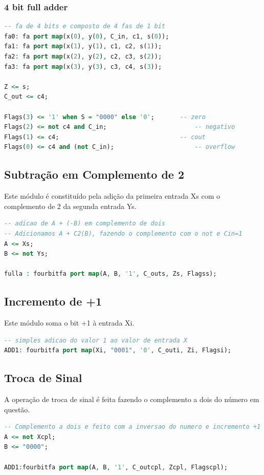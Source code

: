 \documentclass[a4paper, 12pt]{article}
\begin{document}
\subsubsection{4 bit full adder}


\begin{lstlisting}[language=VHDL]
-- fa de 4 bits e composto de 4 fas de 1 bit
fa0: fa port map(x(0), y(0), C_in, c1, s(0));
fa1: fa port map(x(1), y(1), c1, c2, s(1));
fa2: fa port map(x(2), y(2), c2, c3, s(2));
fa3: fa port map(x(3), y(3), c3, c4, s(3));

Z <= s;
C_out <= c4;

Flags(3) <= '1' when S = "0000" else '0';       -- zero
Flags(2) <= not c4 and C_in;				        -- negativo
Flags(1) <= c4;	                                -- cout
Flags(0) <= c4 and (not C_in); 					    -- overflow
\end{lstlisting}

\subsection{Subtração em Complemento de 2}
Este módulo é constituído pela adição da primeira entrada Xs com o complemento de 2 da segunda entrada Ys.

\begin{lstlisting}[language=VHDL]
-- adicao de A + (-B) em complemento de dois
-- Adicionamos A + C2(B), fazendo o complemento com o not e Cin=1
A <= Xs;
B <= not Ys;

fulla : fourbitfa port map(A, B, '1', C_outs, Zs, Flagss);
\end{lstlisting}


\subsection{Incremento de +1}
Este módulo soma o bit +1 à entrada Xi.

\begin{lstlisting}[language=VHDL]
-- simples adicao do valor 1 ao valor de entrada X
ADD1: fourbitfa port map(Xi, "0001", '0', C_outi, Zi, Flagsi);
\end{lstlisting}

\subsection{Troca de Sinal}
A operação de troca de sinal é feita fazendo o complemento a dois do número em questão.
\begin{lstlisting}[language=VHDL]
-- Complemento a dois e feito com a inversao do numero e incremento +1
A <= not Xcpl;
B <= "0000";

ADD1:fourbitfa port map(A, B, '1', C_outcpl, Zcpl, Flagscpl);
\end{lstlisting}
\end{document}
